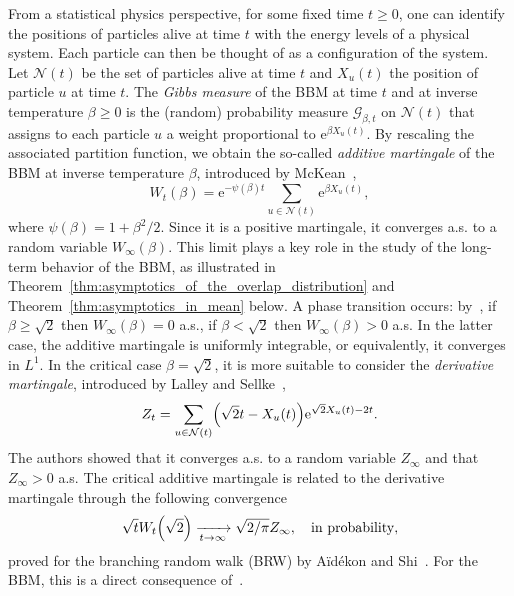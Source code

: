 \documentclass[AHL,Unicode,longabstracts,published]{cedram}
\newcommand{\e}{\mathrm{e}}
\newcommand\1{\mathds{1}}
\newcommand{\cG}{\mathcal{G}}
\newcommand{\cN}{\mathcal{N}}
\let\originalleft\left
\let\originalright\right
\renewcommand{\left}{\mathopen{}\mathclose\bgroup\originalleft}
\renewcommand{\right}{\aftergroup\egroup\originalright}
\renewcommand*{\to}{\mathchoice{\longrightarrow}{\rightarrow}{\rightarrow}{\rightarrow}}
\begin{document}
From a statistical physics perspective, for some fixed time $t \geq 0$, one can identify the positions of particles alive at time $t$ with the energy levels of a physical system. Each particle can then be thought of as a configuration of the system. Let $\cN(t)$ be the set of particles alive at time $t$ and $X_u(t)$ the position of particle $u$ at time $t$. The \emph{Gibbs measure} of the BBM at time $t$ and at inverse temperature $\beta \geq 0$ is the (random) probability measure $\cG_{\beta, t}$ on $\cN(t)$ that assigns to each particle $u$ a weight proportional to $\e^{\beta X_u(t)}$. By rescaling the associated partition function, we obtain the so-called \emph{additive martingale} of the BBM at inverse temperature $\beta$, introduced by McKean~\cite{McKean1975},
\begin{equation}\label{eq:definition_additive_martingale}
W_t(\beta) = \e^{-\psi(\beta)t} \sum_{u \in \cN(t)} \e^{\beta X_u(t)},
\end{equation}
where $\psi(\beta) = 1 + \beta^2/2$. Since it is a positive martingale, it converges a.s. to a random variable $W_\infty(\beta)$. This limit plays a key role in the study of the long-term behavior of the BBM, as illustrated in Theorem~\ref{thm:asymptotics_of_the_overlap_distribution} and Theorem~\ref{thm:asymptotics_in_mean} below. A phase transition occurs: by~\cite[Proposition~1]{Neveu1988}, if $\beta \geq \sqrt{2}$ then $W_\infty(\beta) = 0$ a.s., if $\beta < \sqrt{2}$ then $W_\infty(\beta) > 0$ a.s. In the latter case, the additive martingale is uniformly integrable, or equivalently, it converges in $L^1$. In the critical case $\beta = \sqrt{2}$, it is more suitable to consider the \emph{derivative martingale}, introduced by Lalley and Sellke~\cite{LalleySellke1987},
\begin{equation}\label{eq:definition_derivative_martingale}
Z_t = \sum_{u \in \cN(t)} \left(\sqrt{2}t - X_u(t)\right) \e^{\sqrt{2}X_u(t) - 2t}.
\end{equation}
The authors showed that it converges a.s. to a random variable $Z_\infty$ and that $Z_\infty > 0$ a.s. The critical additive martingale is related to the derivative martingale through the following convergence
\begin{equation}\label{eq:convergence_critical_additive_martingale}
\sqrt{t} W_t\left(\sqrt{2}\right) \xrightarrow[t \to \infty]{} \sqrt{2 \smash{/}\pi} Z_\infty, \quad \text{in probability},
\end{equation}
proved for the branching random walk (BRW) by A\"{i}dékon and Shi~\cite{AidekonShi2014}. For the BBM, this is a direct consequence of~\cite[Proposition~2.2]{MaillardPain2019}.
\end{document}
